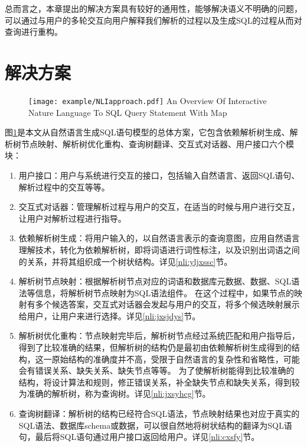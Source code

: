 总而言之，本章提出的解决方案具有较好的通用性，能够解决语义不明确的问题，可以通过与用户的多轮交互向用户解释我们解析的过程以及生成SQL的过程从而对查询进行重构。

\section{解决方案}
\begin{figure}[!htp]
    \centering
    \texttt{[image: example/NLIapproach.pdf]}
      {An Overview Of Interactive Nature Language To SQL Query Statement With Map}
    \label{fig:NLIapproach}
  \end{figure}
图\ref{fig:NLIapproach}是本文从自然语言生成SQL语句模型的总体方案，它包含依赖解析树生成、解析树节点映射、解析树优化重构、查询树翻译、交互式对话器、用户接口六个模块：
\begin{enumerate}
    \item 用户接口：用户与系统进行交互的接口，包括输入自然语言、返回SQL语句、解析过程中的交互等等。
    \item 交互式对话器：管理解析过程与用户的交互，在适当的时候与用户进行交互，让用户对解析过程进行指导。
    \item 依赖解析树生成：将用户输入的，以自然语言表示的查询意图，应用自然语言理解技术，转化为依赖解析树，即将词语进行词性标注，以及识别出词语之间的关系，并将其组织成一个树状结构。详见\ref{nli:yljxssc}节。
    \item 解析树节点映射：根据解析树节点对应的词语和数据库元数据、数据、SQL语法等信息，将解析树节点映射为SQL语法组件。
在这个过程中，如果节点的映射有多个候选答案，交互式对话器会发起与用户的交互，将多个候选映射展示给用户，让用户来进行选择。详见\ref{nli:jxsjdys}节。
    \item 解析树优化重构：节点映射完毕后，解析树节点经过系统匹配和用户指导后，得到了比较准确的结果，但解析树的结构仍是最初由依赖解析树生成得到的结构，这一原始结构的准确度并不高，受限于自然语言的复杂性和省略性，可能会有错误关系、缺失关系、缺失节点等等。
为了使解析树能得到比较准确的结构，将设计算法和规则，修正错误关系，补全缺失节点和缺失关系，得到较为准确的解析树，称为查询树。详见\ref{nli:jxsyhcg}节。
    \item 查询树翻译：解析树的结构已经符合SQL语法，节点映射结果也对应于真实的SQL语法、数据库schema或数据，可以很自然地将树状结构的翻译为SQL语句，最后将SQL语句通过用户接口返回给用户。详见\ref{nli:cxsfy}节。
\end{enumerate}

